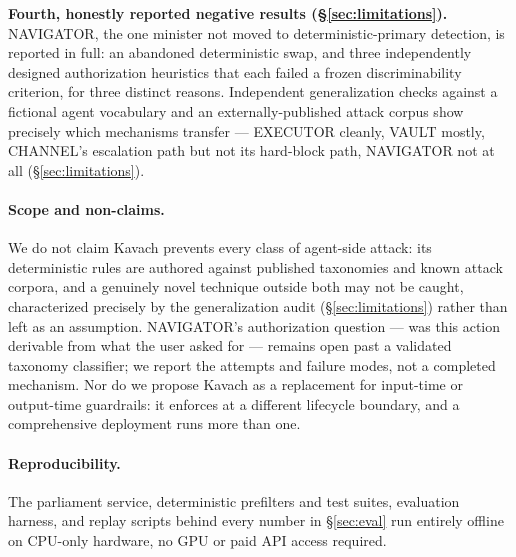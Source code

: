 \textbf{Fourth, honestly reported negative results
(\S\ref{sec:limitations}).} NAVIGATOR, the one minister not moved to
deterministic-primary detection, is reported in full: an abandoned
deterministic swap, and three independently designed authorization
heuristics that each failed a frozen discriminability criterion, for
three distinct reasons. Independent generalization checks against a
fictional agent vocabulary and an externally-published attack corpus show
precisely which mechanisms transfer --- EXECUTOR cleanly, VAULT mostly,
CHANNEL's escalation path but not its hard-block path, NAVIGATOR not at
all (\S\ref{sec:limitations}).

\paragraph{Scope and non-claims.} We do not claim Kavach prevents every
class of agent-side attack: its deterministic rules are authored against
published taxonomies and known attack corpora, and a genuinely novel
technique outside both may not be caught, characterized precisely by the
generalization audit (\S\ref{sec:limitations}) rather than left as an
assumption. NAVIGATOR's authorization question --- was this action
derivable from what the user asked for --- remains open past a validated
taxonomy classifier; we report the attempts and failure modes, not a
completed mechanism. Nor do we propose Kavach as a replacement for
input-time or output-time guardrails: it enforces at a different
lifecycle boundary, and a comprehensive deployment runs more than one.

\paragraph{Reproducibility.} The parliament service, deterministic
prefilters and test suites, evaluation harness, and replay scripts behind
every number in \S\ref{sec:eval} run entirely offline on CPU-only
hardware, no GPU or paid API access required.

